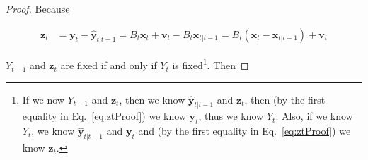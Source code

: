 \documentclass[12pt]{article}
\begin{document}
\begin{proof}
    Because

    \begin{align}
        \mathbf{z}_t&=\mathbf{y}_t-\hat{\mathbf{y}}_{t|t-1}=B_t\mathbf{x}_t+\mathbf{v}_t-B_t\mathbf{x}_{t|t-1}=B_t(\mathbf{x}_t-\mathbf{x}_{t|t-1})+\mathbf{v}_t\label{eq:ztProof}
    \end{align}

    \noindent $Y_{t-1}$ and $\mathbf{z}_t$ are fixed if and only if $Y_t$ is
    fixed\footnote{If we now $Y_{t-1}$ and $\mathbf{z}_t$, then we know
    $\hat{\mathbf{y}}_{t|t-1}$ and $\mathbf{z}_t$, then (by the first equality
    in Eq.~\ref{eq:ztProof}) we know $\mathbf{y}_t$, thus we know $Y_t$. Also, if we
    know $Y_t$, we know $\hat{\mathbf{y}}_{t|t-1}$ and $\mathbf{y}_t$ and (by
    the first equality in Eq.~\ref{eq:ztProof}) we know $\mathbf{z}_t$.}. Then


\end{proof}
\end{document}
